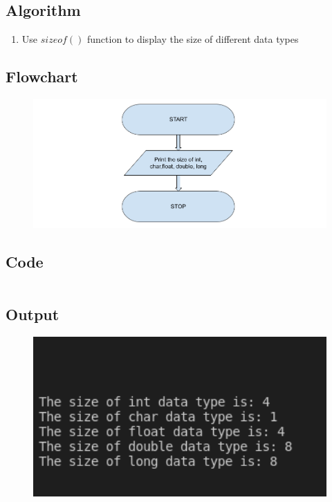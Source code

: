 \documentclass[12pt]{article}
\begin{document}
\subsection{Algorithm}
\begin{enumerate}
    \item Use $sizeof()$ function to display the size of different data types
\end{enumerate}
\subsection{Flowchart}
\begin{figure}[h]
    \centering
    \includegraphics[width=1.0\textwidth]{Flowchart03.png}
\end{figure}
\newpage
\subsection{Code}
\inputminted{c}{q3.c}
\subsection{Output}
\begin{figure}[h]
    \centering
    \includegraphics[width=1.0\textwidth]{3.png}
\end{figure}
\newpage
\end{document}
